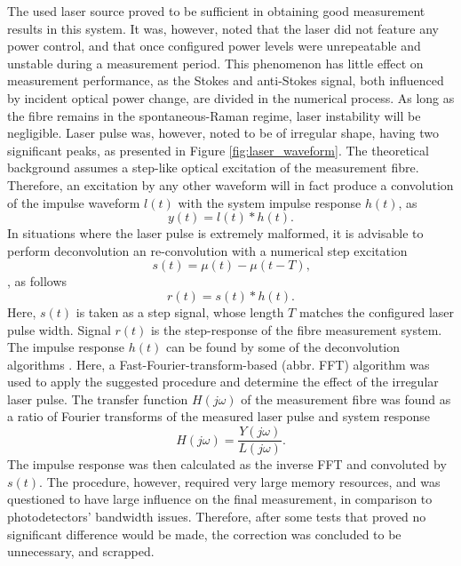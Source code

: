 \documentclass{standalone}
\begin{document}
The used laser source proved to be sufficient in obtaining good measurement results in this system. It was, however, noted that the laser did not feature any power control, and that once configured power levels were unrepeatable and unstable during a measurement period. This phenomenon has little effect on measurement performance, as the Stokes and anti-Stokes signal, both influenced by incident optical power change, are divided in the numerical process. As long as the fibre remains in the spontaneous-Raman regime, laser instability will be negligible. Laser pulse was, however, noted to be of irregular shape, having two significant peaks, as presented in Figure \ref{fig:laser_waveform}.
The theoretical background assumes a step-like optical excitation of the measurement fibre. Therefore, an excitation by any other waveform will in fact produce a convolution of the impulse waveform $l(t)$ with the system impulse response $h(t)$, as
\begin{equation}
y(t) = l(t) \ast h(t) \textrm{.}
\end{equation}
In situations where the laser pulse is extremely malformed, it is advisable to perform deconvolution an re-convolution with a numerical step excitation
\begin{equation}
s(t) = \mu(t) - \mu(t-T) \textrm{,}
\end{equation}, as follows
\begin{equation}
r(t) = s(t) \ast h(t) \textrm{.}
\end{equation}
Here, $s(t)$ is taken as a step signal, whose length $T$ matches the configured laser pulse width. Signal $r(t)$ is the step-response of the fibre measurement system. The impulse response $h(t)$ can be found by some of the deconvolution algorithms \cite{fer:obrinf}. Here, a Fast-Fourier-transform-based (abbr. FFT) algorithm was used to apply the suggested procedure and determine the effect of the irregular laser pulse. The transfer function $H(j\omega)$ of the measurement fibre was found as a ratio of Fourier transforms of the measured laser pulse and system response
\begin{equation}
H(j\omega) = \frac{Y(j\omega)}{L(j\omega)} \textrm{.}
\end{equation}
The impulse response was then calculated as the inverse FFT and convoluted by $s(t)$. The procedure, however, required very large memory resources, and was questioned to have large influence on the final measurement, in comparison to photodetectors' bandwidth issues. Therefore, after some tests that proved no significant difference would be made, the correction was concluded to be unnecessary, and scrapped. \\
\end{document}
